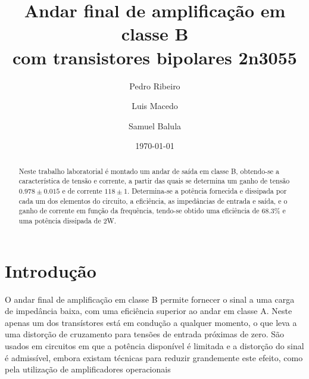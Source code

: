 \documentclass[%
  reprint,
  nofootinbib,
  amsmath,amssymb,
  aps,
  10pt,
  a4paper
]{revtex4-1}
\begin{document}


 

\title{Andar final de amplificação em classe B\\
com transistores bipolares 2n3055}

\author{Pedro Ribeiro}%
\author{Luis Macedo}%
\author{Samuel Balula}%



\date{\today}

\begin{abstract}
Neste trabalho laboratorial é montado um andar de saída em classe B, obtendo-se a característica de tensão e corrente, a partir das quais se determina um ganho de tensão $0.978\pm0.015$ e de corrente $118\pm1$. Determina-se a potência fornecida e dissipada por cada um dos elementos do circuito, a eficiência, as impedâncias de entrada e saída, e o ganho de corrente em função da frequência, tendo-se obtido uma eficiência de 68.3\% e uma potência dissipada de 2W. 

\end{abstract}
\maketitle


\section{Introdução}
\label{s:intro}
O andar final de amplificação em classe B permite fornecer o sinal a uma carga de impedância baixa, com uma eficiência superior ao andar em classe A. Neste apenas um dos transístores está em condução a qualquer momento, o que leva a uma distorção de cruzamento para tensões de entrada próximas de zero. São usados em circuitos em que a potência disponível é limitada e a distorção do sinal é admissível, embora existam técnicas para reduzir grandemente este efeito, como pela utilização de amplificadores operacionais
\end{document}
